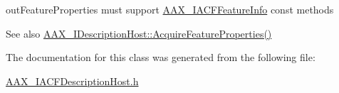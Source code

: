 {\ttfamily out\+Feature\+Properties} must support \mbox{\hyperlink{a01689}{A\+A\+X\+\_\+\+I\+A\+C\+F\+Feature\+Info}} const methods

\begin{DoxySeeAlso}{See also}
\mbox{\hyperlink{a01793_aa0d9e27d0207113f98c217d870bfa5e9}{A\+A\+X\+\_\+\+I\+Description\+Host\+::\+Acquire\+Feature\+Properties()}} 
\end{DoxySeeAlso}


The documentation for this class was generated from the following file\+:\begin{DoxyCompactItemize}
\item 
\mbox{\hyperlink{a00518}{A\+A\+X\+\_\+\+I\+A\+C\+F\+Description\+Host.\+h}}\end{DoxyCompactItemize}
